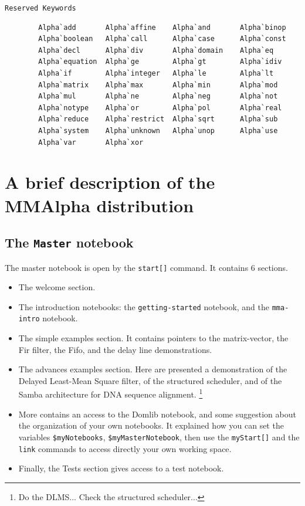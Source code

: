\documentclass[12pt]{article}
\newcommand{\MMA}{{\sc MMAlpha}}
\newcommand{\MMAlfa}{\MMA}
\begin{document}
\texttt{Reserved Keywords}

\begin{verbatim}
        Alpha`add       Alpha`affine    Alpha`and       Alpha`binop
        Alpha`boolean   Alpha`call      Alpha`case      Alpha`const
        Alpha`decl      Alpha`div       Alpha`domain    Alpha`eq
        Alpha`equation  Alpha`ge        Alpha`gt        Alpha`idiv
        Alpha`if        Alpha`integer   Alpha`le        Alpha`lt
        Alpha`matrix    Alpha`max       Alpha`min       Alpha`mod
        Alpha`mul       Alpha`ne        Alpha`neg       Alpha`not
        Alpha`notype    Alpha`or        Alpha`pol       Alpha`real
        Alpha`reduce    Alpha`restrict  Alpha`sqrt      Alpha`sub
        Alpha`system    Alpha`unknown   Alpha`unop      Alpha`use
        Alpha`var       Alpha`xor
\end{verbatim}

\section{A brief description of the \MMAlfa{} distribution}
\label{mmalphacontent}

\subsection{The \texttt{Master} notebook}
The master notebook is open by the \texttt{start[]} 
command. It contains 6 sections.
\begin{itemize}
\item The welcome section. 
\item The introduction notebooks: the 
\texttt{getting-started}
notebook, and the \texttt{mma-intro}
notebook. 
\item The simple examples section. It contains pointers to the 
matrix-vector, the Fir filter, the Fifo, and the delay line 
demonstrations. 
\item The advances examples section. Here are presented a demonstration
of the Delayed Least-Mean Square filter, of the structured scheduler, 
and of the Samba architecture for DNA sequence alignment.
\footnote{Do the DLMS... Check the structured scheduler...}
\item More contains an access to the Domlib notebook, and some
suggestion about the organization of your own notebooks. It 
explained how you can set the variables \texttt{\$myNotebooks},
\texttt{\$myMasterNotebook}, then use the \texttt{myStart[]} 
and the \texttt{link}
commands to access directly your own working space. 
\item Finally, the Tests section gives access to a test notebook. 
\end{itemize}
\end{document}
